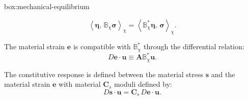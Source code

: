 \begin{ambox}{box:mechanical-equilibrium}
\begin{description}
\begin{equation}
  \left<\bm{\eta},\, \mathbb{B}_\chi\bm{\sigma}\right>_\chi = \left<\mathbb{B}_\chi^*\bm{\eta},\, \bm{\sigma}\right>_\chi.
  \label{eq:def-adjoint}
\end{equation}
\item[Strain]
The material strain \(\bm{e}\) is compatible with
\(\mathbb{B}^*_\chi\) through the differential relation: 
\begin{equation}
  D\bm{e}\cdot\bm{u} \equiv \bm{A}\mathbb{B}^*_\chi \bm{u}.
  \label{eq:vstrain}
\end{equation}
%
\item[Constitution]
The constitutive response is defined between the material stress
\(\bm{s}\) and the material strain \(\bm{e}\) with material \(\bm{C}_s\)  moduli defined by:
\begin{equation}
  D \bm{s}\cdot \bm{u} = \bm{C}_s \, D \bm{e}\cdot {\bm{u}}.
  \label{eq:def-moduli}
\end{equation}
\end{description}
\end{ambox}
\fi
\fi 
